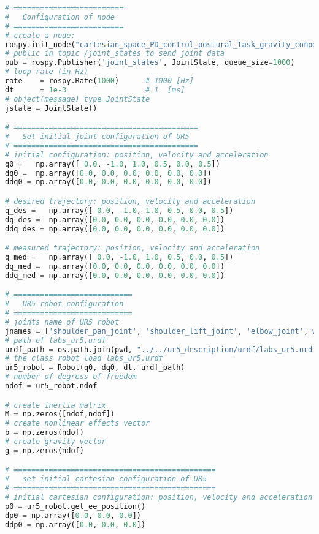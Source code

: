 \begin{lstlisting}[language=Python, caption={Move the ur5 robot end-effector using the Cartesian proportional-derivative control method with gravity compensation, feed-forward term and null space projection, \eqref{eq:cartesian_PD_g_ff_N} to follows the Cartesian sinusoidal reference of activity \ref{subsec:generate_sinusoidal_reference}.}, label={lst:cartesian_PD_g_ff_N}]
# =========================
#   Configuration of node
# =========================
# create a node: 
rospy.init_node("cartesian_space_PD_control_postural_task_gravity_compensation_feedforward_term")
# public in topic /joint_states	to send joint data	
pub = rospy.Publisher('joint_states', JointState, queue_size=1000)
# loop rate (in Hz)
rate 	= rospy.Rate(1000)		# 1000 [Hz]
dt 		= 1e-3					# 1  [ms]
# object(message) type JointState
jstate = JointState()

# ==========================================
#   Set initial joint configuration of UR5
# ==========================================
# initial configuration: position, velocity and acceleration 
q0 =   np.array([ 0.0, -1.0, 1.0, 0.5, 0.0, 0.5])
dq0 =  np.array([0.0, 0.0, 0.0, 0.0, 0.0, 0.0]) 
ddq0 = np.array([0.0, 0.0, 0.0, 0.0, 0.0, 0.0]) 

# desired trajectory: position, velocity and acceleration
q_des =   np.array([ 0.0, -1.0, 1.0, 0.5, 0.0, 0.5])
dq_des =  np.array([0.0, 0.0, 0.0, 0.0, 0.0, 0.0]) 
ddq_des = np.array([0.0, 0.0, 0.0, 0.0, 0.0, 0.0]) 

# measured trajectory: position, velocity and acceleration
q_med =   np.array([ 0.0, -1.0, 1.0, 0.5, 0.0, 0.5])
dq_med =  np.array([0.0, 0.0, 0.0, 0.0, 0.0, 0.0]) 
ddq_med = np.array([0.0, 0.0, 0.0, 0.0, 0.0, 0.0]) 

# ===========================
#   UR5 robot configuration
# ===========================
# joints name of UR5 robot
jnames = ['shoulder_pan_joint', 'shoulder_lift_joint', 'elbow_joint','wrist_1_joint', 'wrist_2_joint', 'wrist_3_joint']
# path of labs_ur5.urdf
urdf_path = os.path.join(pwd, "../../ur5_description/urdf/labs_ur5.urdf")
# the class robot load labs_ur5.urdf
ur5_robot = Robot(q0, dq0, dt, urdf_path)
# number of degress of freedom
ndof = ur5_robot.ndof

# create inertia matrix 
M = np.zeros([ndof,ndof])
# create nonlinear effects vector
b = np.zeros(ndof)
# create gravity vector
g = np.zeros(ndof)

# ==============================================
#   set initial cartesian configuration of UR5
# ==============================================
# initial cartesian configuration: position, velocity and acceleration
p0 = ur5_robot.get_ee_position()
dp0 = np.array([0.0, 0.0, 0.0])
ddp0 = np.array([0.0, 0.0, 0.0])


\end{lstlisting}
